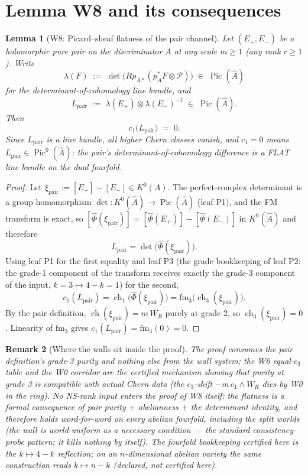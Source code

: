 \documentclass[11pt]{article}
\newtheorem{lemma}{Lemma}[section]
\newtheorem{remark}[lemma]{Remark}
\newcommand{\WR}{W_R}
\newcommand{\ch}{\operatorname{ch}}
\newcommand{\Pic}{\operatorname{Pic}}
\newcommand{\KA}{A}
\newcommand{\KAd}{\widehat{A}}
\begin{document}
\section{Lemma W8 and its consequences}

\begin{lemma}[W8: Picard--sheaf flatness of the pair channel]
\label{lem:W8}
Let $(E_+,E_-)$ be a holomorphic pure pair on the discriminator $\KA$ at any
scale $m\ge 1$ (any rank $r\ge 1$). Write
\[
\lambda(F) \;:=\; \det\bigl(Rp_{\KAd *}(p_\KA^*F\otimes \mathcal{P})\bigr)
\;\in\; \Pic(\KAd)
\]
for the determinant-of-cohomology line bundle, and
\[
L_{\mathrm{pair}} \;:=\; \lambda(E_+)\otimes \lambda(E_-)^{-1}\;\in\;\Pic(\KAd).
\]
Then
\[
c_1\bigl(L_{\mathrm{pair}}\bigr) \;=\; 0.
\]
Since $L_{\mathrm{pair}}$ is a line bundle, all higher Chern classes vanish,
and $c_1 = 0$ means $L_{\mathrm{pair}} \in \Pic^0(\KAd)$: the pair's
determinant-of-cohomology difference is a FLAT line bundle on the dual
fourfold.
\end{lemma}

\begin{proof}
Let $\xi_{\mathrm{pair}} := [E_+] - [E_-] \in K^0(\KA)$. The perfect-complex
determinant is a group homomorphism $\det : K^0(\KAd) \to \Pic(\KAd)$ (leaf
P1), and the FM transform is exact, so
$[\widehat\Phi(\xi_{\mathrm{pair}})] = [\widehat\Phi(E_+)] -
[\widehat\Phi(E_-)]$ in $K^0(\KAd)$ and therefore
\[
L_{\mathrm{pair}}
= \det\bigl(\widehat\Phi(\xi_{\mathrm{pair}})\bigr).
\]
Using leaf P1 for the first equality and leaf P3 (the grade bookkeeping of
leaf P2: the grade-1 component of the transform receives exactly the
grade-3 component of the input, $k=3 \mapsto 4-k=1$) for the second,
\[
c_1(L_{\mathrm{pair}})
= \ch_1\bigl(\widehat\Phi(\xi_{\mathrm{pair}})\bigr)
= \mathrm{fm}_3\bigl(\ch_3(\xi_{\mathrm{pair}})\bigr).
\]
By the pair definition, $\ch(\xi_{\mathrm{pair}}) = m\,\WR$ purely at
grade 2, so $\ch_3(\xi_{\mathrm{pair}}) = 0$. Linearity of $\mathrm{fm}_3$
gives $c_1(L_{\mathrm{pair}}) = \mathrm{fm}_3(0) = 0$.
\end{proof}

\begin{remark}[Where the walls sit inside the proof]
The proof consumes the pair definition's grade-3 purity and nothing else
from the wall system; the W6 equal-$c_3$ table and the W0 corridor are the
certified \emph{mechanism} showing that purity at grade 3 is compatible
with actual Chern data (the $c_3$-shift $-m\,c_1\wedge\WR$ dies by W0 in
the ring). No NS-rank input enters the proof of W8 itself: the flatness is
a formal consequence of pair purity $+$ abelianness $+$ the determinant
identity, and therefore holds word-for-word on every abelian fourfold,
including the split worlds (the wall is world-uniform as a necessary
condition --- the standard consistency-probe pattern; it kills nothing by
itself). The fourfold bookkeeping certified here is the $k\mapsto 4-k$
reflection; on an $n$-dimensional abelian variety the same construction
reads $k\mapsto n-k$ (declared, not certified here).
\end{remark}
\end{document}
